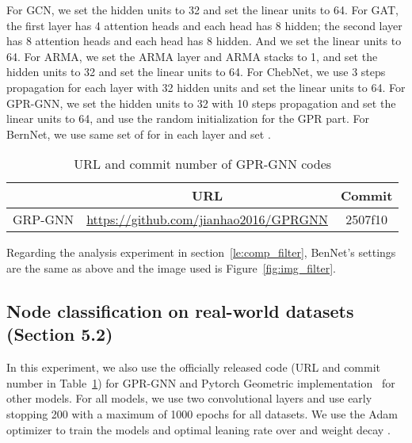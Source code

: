 \documentclass{article}
\begin{document}
For GCN, we set the hidden units to 32 and set the linear units to 64. For GAT, the first layer has 4 attention heads and each head has 8 hidden; the second layer has 8 attention heads and each head has 8 hidden. And we set the linear units to 64. For ARMA, we set the ARMA layer and ARMA stacks to 1, and set the hidden units to 32 and set the linear units to 64. For ChebNet, we use 3 steps propagation for each layer with 32 hidden units and set the linear units to 64. For GPR-GNN, we set the hidden units to 32 with 10 steps propagation and set the linear units to 64, and use the random initialization for the GPR part. For BernNet, we use same set of  for  in each layer and set . 



\begin{table}[ht]
    \centering
    \caption{URL and commit number of GPR-GNN codes}
    \label{url_commit}
    \begin{tabular}{@{}lcc@{}}
    \toprule
         & URL &Commit  \\ \midrule
         GRP-GNN&\url{https://github.com/jianhao2016/GPRGNN} &2507f10\\ \bottomrule
    \end{tabular}
\end{table}
Regarding the analysis experiment in section~\ref{le:comp_filter}, BenNet's settings are the same as above and the image used is Figure~\ref{fig:img_filter}.



\subsection{Node classification on real-world datasets (Section 5.2)}
In this experiment, we also  use the officially released code (URL and commit number in Table~\ref{url_commit}) for GPR-GNN and Pytorch Geometric implementation~\cite{fey2019fast} for other models. For all models, we use two convolutional layers and use early stopping 200 with a maximum of 1000 epochs for all datasets. We use the Adam optimizer to train the models and optimal leaning rate over  and weight decay . 
\end{document}
